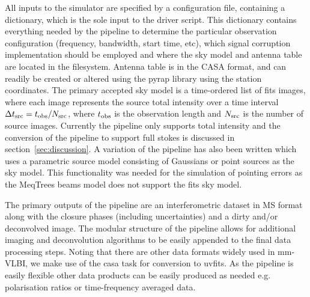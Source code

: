 All inputs to the simulator are specified by a configuration file, containing a dictionary, which is the sole input to the driver script. This dictionary contains everything needed by the pipeline to determine the particular observation configuration (frequency, bandwidth, start time, etc), which signal corruption implementation should be employed and where the sky model and antenna table are located in the filesystem. Antenna table is in the CASA format, and can readily be created or altered using the {\sc pyrap} library using the station coordinates. The primary accepted sky model is a time-ordered list of {\sc fits} images, where each image represents the source total intensity over a time interval $\Delta t_{\rm src} = t_{\rm obs}/N_{\rm src}$, where $t_{\rm obs}$ is the observation length and $N_{\rm src}$ is the number of source images. Currently the pipeline only supports total intensity and the conversion of the pipeline to support full stokes is discussed in section~\ref{sec:discussion}. A variation of the pipeline has also been written which uses a parametric source model consisting of Gaussians or point sources as the sky model. This functionality was needed for the simulation of pointing errors as the {\sc MeqTrees} beams model does not support the {\sc fits} sky model.


The primary outputs of the pipeline are an interferometric dataset in MS format along with the closure phases (including uncertainties) and a dirty and/or deconvolved image. The modular structure of the pipeline allows for additional imaging and deconvolution algorithms to be easily appended to the final data processing steps. Noting that there are other data formats widely used in mm-VLBI, we make use of the {\sc casa} task for conversion to {\sc uvfits}. As the pipeline is easily flexible other data products can be easily produced as needed e.g. polarisation ratios or time-frequency averaged data.





